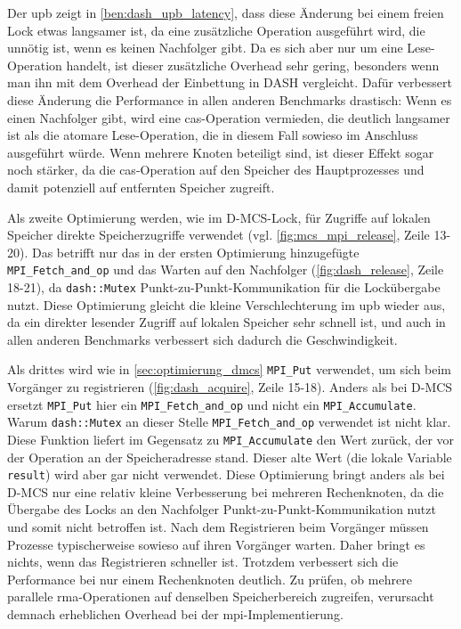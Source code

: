 Der \gls{upb} zeigt in \autoref{ben:dash_upb_latency},
dass diese Änderung bei einem freien Lock etwas langsamer ist,
da eine zusätzliche Operation ausgeführt wird,
die unnötig ist,
wenn es keinen Nachfolger gibt.
Da es sich aber nur um eine Lese-Operation handelt,
ist dieser zusätzliche Overhead sehr gering,
besonders wenn man ihn mit dem Overhead der Einbettung in DASH vergleicht.
Dafür verbessert diese Änderung die Performance in allen anderen Benchmarks drastisch:
Wenn es einen Nachfolger gibt,
wird eine \gls{cas}-Operation vermieden,
die deutlich langsamer ist als die atomare Lese-Operation,
die in diesem Fall sowieso im Anschluss ausgeführt würde.
Wenn mehrere Knoten beteiligt sind,
ist dieser Effekt sogar noch stärker,
da die \gls{cas}-Operation auf den Speicher des Hauptprozesses
und damit potenziell auf entfernten Speicher zugreift.

Als zweite Optimierung werden,
wie im D-MCS-Lock,
für Zugriffe auf lokalen Speicher direkte Speicherzugriffe verwendet (vgl. \autoref{fig:mcs_mpi_release}, Zeile 13-20).
Das betrifft nur das in der ersten Optimierung hinzugefügte \texttt{MPI\_Fetch\_and\_op}
und das Warten auf den Nachfolger (\autoref{fig:dash_release}, Zeile 18-21),
da \texttt{dash::Mutex} Punkt-zu-Punkt-Kommunikation für die Lockübergabe nutzt.
Diese Optimierung gleicht die kleine Verschlechterung im \gls{upb} wieder aus,
da ein direkter lesender Zugriff auf lokalen Speicher sehr schnell ist,
und auch in allen anderen Benchmarks verbessert sich dadurch die Geschwindigkeit.

Als drittes wird wie in \autoref{sec:optimierung_dmcs} \texttt{MPI\_Put} verwendet,
um sich beim Vorgänger zu registrieren (\autoref{fig:dash_acquire}, Zeile 15-18).
Anders als bei D-MCS ersetzt \texttt{MPI\_Put} hier ein \texttt{MPI\_Fetch\_and\_op} und nicht ein \texttt{MPI\_Accumulate}.
Warum \texttt{dash::Mutex} an dieser Stelle \texttt{MPI\_Fetch\_and\_op} verwendet ist nicht klar.
Diese Funktion liefert im Gegensatz zu \texttt{MPI\_Accumulate} den Wert zurück,
der vor der Operation an der Speicheradresse stand.
Dieser alte Wert (die lokale Variable \texttt{result}) wird aber gar nicht verwendet.
Diese Optimierung bringt anders als bei D-MCS nur eine relativ kleine Verbesserung bei mehreren Rechenknoten,
da die Übergabe des Locks an den Nachfolger Punkt-zu-Punkt-Kommunikation nutzt
und somit nicht betroffen ist.
Nach dem Registrieren beim Vorgänger müssen Prozesse typischerweise sowieso auf ihren Vorgänger warten.
Daher bringt es nichts,
wenn das Registrieren schneller ist.
Trotzdem verbessert sich die Performance bei nur einem Rechenknoten deutlich.
Zu prüfen,
ob mehrere parallele \gls{rma}-Operationen auf denselben Speicherbereich zugreifen,
verursacht demnach erheblichen Overhead bei der \gls{mpi}-Implementierung.

